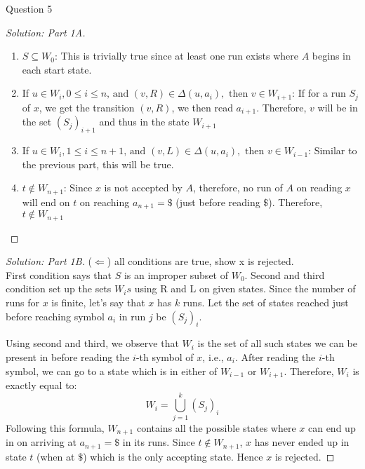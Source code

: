 \begin{solution}{Question 5}
\begin{proof}[Solution: Part 1A]
\begin{enumerate}
        \item $S \subseteq W_0$: This is trivially true since at least one run exists where $A$ begins in each start state.
        \item If $u \in W_i, 0 \leq i \leq n \text{, and } (v,R) \in \Delta (u,a_i), \text{ then } v \in W_{i+1}$: If for a run $S_j$ of $x$, we get the transition $(v, R)$, we then read $a_{i+1}$. Therefore, $v$ will be in the set $(S_j)_{i+1}$ and thus in the state $W_{i+1}$
        \item If $u \in W_i, 1 \leq i \leq n+1 \text{, and } (v,L) \in \Delta (u,a_i), \text{ then } v \in W_{i-1}$: Similar to the previous part, this will be true.
        \item $t \not\in W_{n+1}$: Since $x$ is not accepted by $A$, therefore, no run of $A$ on reading $x$ will end on $t$ on reaching $a_{n+1} = \$$ (just before reading $\$$). Therefore, $t \not\in W_{n+1}$
    \end{enumerate}
    \end{proof}
    
    \begin{proof}[Solution: Part 1B]
    ($\Longleftarrow$) all conditions are true, show x is rejected.\\
    
    First condition says that $S$ is an improper subset of $W_0$. Second and third condition set up the sets $W_is$ using R and L on given states. Since the number of runs for $x$ is finite, let's say that $x$ has $k$ runs. Let the set of states reached just before reaching symbol $a_i$ in run $j$ be $(S_j)_i$.
    
    Using second and third, we observe that $W_i$ is the set of all such states we can be present in before reading the $i$-th symbol of $x$, i.e., $a_i$. After reading the $i$-th symbol, we can go to a state which is in either of $W_{i-1}$ or $W_{i+1}$. Therefore, $W_i$ is exactly equal to:
    \begin{equation}
        W_i = \bigcup_{j=1}^k (S_j)_i
    \end{equation}
    Following this formula, $W_{n+1}$ contains all the possible states where $x$ can end up in on arriving at $a_{n+1} = \$$ in its runs. Since $t \not\in W_{n+1}$, $x$ has never ended up in state $t$ (when at $\$$) which is the only accepting state. Hence $x$ is rejected.
    \end{proof}
    

\end{solution}
